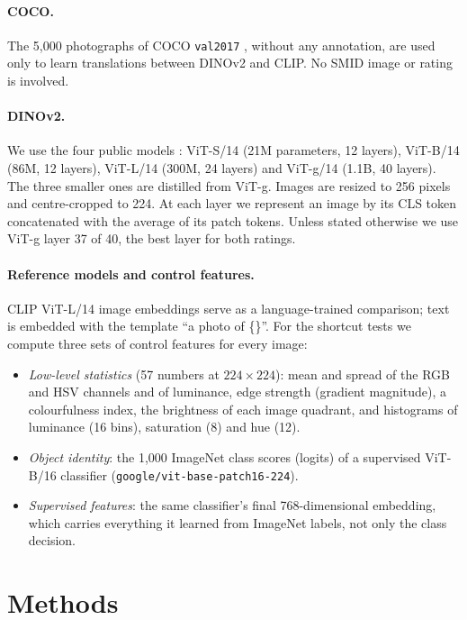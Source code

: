 \documentclass[11pt]{article}
\begin{document}
\paragraph{COCO.} The 5,000 photographs of COCO \texttt{val2017} \cite{lin2014}, without any annotation, are used only to learn translations between DINOv2 and CLIP. No SMID image or rating is involved.

\paragraph{DINOv2.} We use the four public models \cite{oquab2023}: ViT-S/14 (21M parameters, 12 layers), ViT-B/14 (86M, 12 layers), ViT-L/14 (300M, 24 layers) and ViT-g/14 (1.1B, 40 layers). The three smaller ones are distilled from ViT-g. Images are resized to 256 pixels and centre-cropped to 224. At each layer we represent an image by its CLS token concatenated with the average of its patch tokens. Unless stated otherwise we use ViT-g layer 37 of 40, the best layer for both ratings.

\paragraph{Reference models and control features.} CLIP ViT-L/14 \cite{radford2021} image embeddings serve as a language-trained comparison; text is embedded with the template ``a photo of \{\}''. For the shortcut tests we compute three sets of control features for every image:
\begin{itemize}
\item \emph{Low-level statistics} (57 numbers at $224\times224$): mean and spread of the RGB and HSV channels and of luminance, edge strength (gradient magnitude), a colourfulness index, the brightness of each image quadrant, and histograms of luminance (16 bins), saturation (8) and hue (12).
\item \emph{Object identity}: the 1,000 ImageNet \cite{deng2009} class scores (logits) of a supervised ViT-B/16 classifier \cite{dosovitskiy2021} (\texttt{google/vit-base-patch16-224}).
\item \emph{Supervised features}: the same classifier's final 768-dimensional embedding, which carries everything it learned from ImageNet labels, not only the class decision.
\end{itemize}

\section{Methods}
\end{document}
